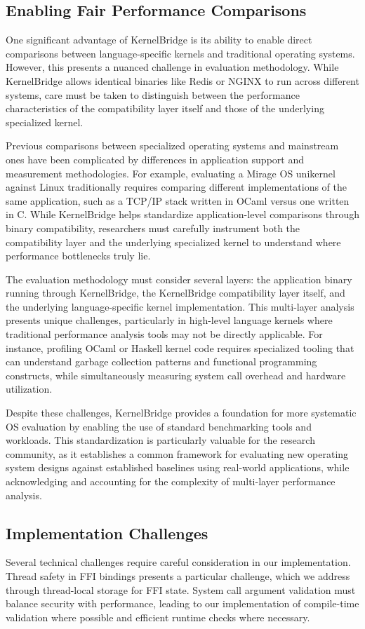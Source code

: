 \documentclass[conference]{IEEEtran}
\begin{document}
\subsection{Enabling Fair Performance Comparisons}
One significant advantage of KernelBridge is its ability to enable direct comparisons between language-specific kernels and traditional operating systems. However, this presents a nuanced challenge in evaluation methodology. While KernelBridge allows identical binaries like Redis or NGINX to run across different systems, care must be taken to distinguish between the performance characteristics of the compatibility layer itself and those of the underlying specialized kernel.

Previous comparisons between specialized operating systems and mainstream ones have been complicated by differences in application support and measurement methodologies. For example, evaluating a Mirage OS unikernel against Linux traditionally requires comparing different implementations of the same application, such as a TCP/IP stack written in OCaml versus one written in C. While KernelBridge helps standardize application-level comparisons through binary compatibility, researchers must carefully instrument both the compatibility layer and the underlying specialized kernel to understand where performance bottlenecks truly lie.

The evaluation methodology must consider several layers: the application binary running through KernelBridge, the KernelBridge compatibility layer itself, and the underlying language-specific kernel implementation. This multi-layer analysis presents unique challenges, particularly in high-level language kernels where traditional performance analysis tools may not be directly applicable. For instance, profiling OCaml or Haskell kernel code requires specialized tooling that can understand garbage collection patterns and functional programming constructs, while simultaneously measuring system call overhead and hardware utilization.

Despite these challenges, KernelBridge provides a foundation for more systematic OS evaluation by enabling the use of standard benchmarking tools and workloads. This standardization is particularly valuable for the research community, as it establishes a common framework for evaluating new operating system designs against established baselines using real-world applications, while acknowledging and accounting for the complexity of multi-layer performance analysis.

\subsection{Implementation Challenges}
Several technical challenges require careful consideration in our implementation. Thread safety in FFI bindings presents a particular challenge, which we address through thread-local storage for FFI state. System call argument validation must balance security with performance, leading to our implementation of compile-time validation where possible and efficient runtime checks where necessary.
\end{document}
